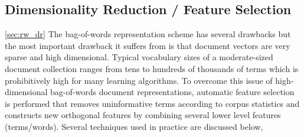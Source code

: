 
\subsection{Dimensionality Reduction / Feature Selection}
\ref{sec:rw_dr}
The bag-of-words representation scheme has several drawbacks but the most important drawback it suffers from is that document vectors are very sparse and high dimensional. Typical vocabulary sizes of a moderate-sized document collection ranges from tens to hundreds of thousands of terms which is prohibitively high for many learning algorithms. 
To overcome this issue of high-dimensional bag-of-words document representations, automatic feature selection is performed that removes uninformative terms according to corpus statistics and constructs new orthogonal features by combining several lower level features (terms/words). Several techniques used in practice are discussed below, 
